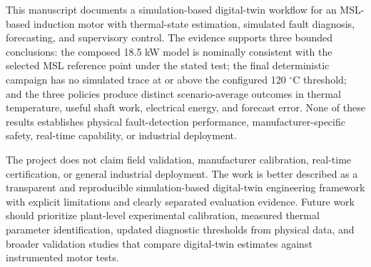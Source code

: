\documentclass[machines,article,submit,moreauthors]{Definitions/mdpi}
\begin{document}
This manuscript documents a simulation-based digital-twin workflow for an MSL-based induction motor with thermal-state estimation, simulated fault diagnosis, forecasting, and supervisory control. The evidence supports three bounded conclusions: the composed 18.5 kW model is nominally consistent with the selected MSL reference point under the stated test; the final deterministic campaign has no simulated trace at or above the configured 120 $^{\circ}$C threshold; and the three policies produce distinct scenario-average outcomes in thermal temperature, useful shaft work, electrical energy, and forecast error. None of these results establishes physical fault-detection performance, manufacturer-specific safety, real-time capability, or industrial deployment.

The project does not claim field validation, manufacturer calibration, real-time certification, or general industrial deployment. The work is better described as a transparent and reproducible simulation-based digital-twin engineering framework with explicit limitations and clearly separated evaluation evidence. Future work should prioritize plant-level experimental calibration, measured thermal parameter identification, updated diagnostic thresholds from physical data, and broader validation studies that compare digital-twin estimates against instrumented motor tests.





\end{document}
